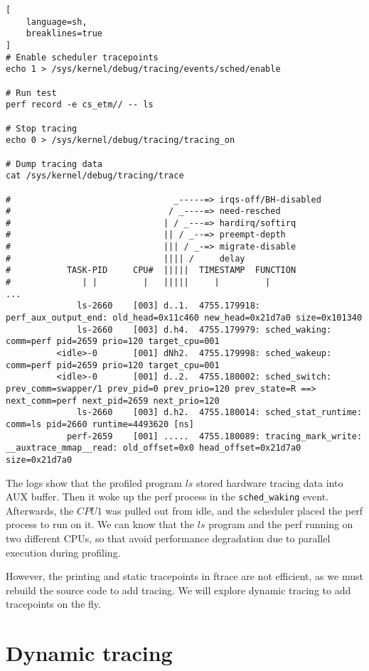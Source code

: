 \documentclass[11pt]{diazessay} %
\def\code#1{\texttt{#1}}
\begin{document}
\begin{lstlisting}[
  	language=sh,
	breaklines=true
]
# Enable scheduler tracepoints
echo 1 > /sys/kernel/debug/tracing/events/sched/enable

# Run test
perf record -e cs_etm// -- ls

# Stop tracing
echo 0 > /sys/kernel/debug/tracing/tracing_on

# Dump tracing data
cat /sys/kernel/debug/tracing/trace

#                                _-----=> irqs-off/BH-disabled
#                               / _----=> need-resched
#                              | / _---=> hardirq/softirq
#                              || / _--=> preempt-depth
#                              ||| / _-=> migrate-disable
#                              |||| /     delay
#           TASK-PID     CPU#  |||||  TIMESTAMP  FUNCTION
#              | |         |   |||||     |         |
...
              ls-2660    [003] d..1.  4755.179918: perf_aux_output_end: old_head=0x11c460 new_head=0x21d7a0 size=0x101340
              ls-2660    [003] d.h4.  4755.179979: sched_waking: comm=perf pid=2659 prio=120 target_cpu=001
          <idle>-0       [001] dNh2.  4755.179998: sched_wakeup: comm=perf pid=2659 prio=120 target_cpu=001
          <idle>-0       [001] d..2.  4755.180002: sched_switch: prev_comm=swapper/1 prev_pid=0 prev_prio=120 prev_state=R ==> next_comm=perf next_pid=2659 next_prio=120
              ls-2660    [003] d.h2.  4755.180014: sched_stat_runtime: comm=ls pid=2660 runtime=4493620 [ns]
            perf-2659    [001] .....  4755.180089: tracing_mark_write: __auxtrace_mmap__read: old_offset=0x0 head_offset=0x21d7a0 size=0x21d7a0
\end{lstlisting}

The logs show that the profiled program \(ls\) stored hardware tracing data
into AUX buffer. Then it woke up the perf process in the \code{sched\_waking}
event. Afterwards, the \(CPU1\) was pulled out from idle, and the scheduler
placed the perf process to run on it. We can know that the \(ls\) program and
the perf running on two different CPUs, so that avoid performance degradation
due to parallel execution during profiling.

However, the printing and static tracepoints in ftrace are not efficient, as
we must rebuild the source code to add tracing. We will explore dynamic
tracing to add tracepoints on the fly.

\section*{Dynamic tracing}
\end{document}
